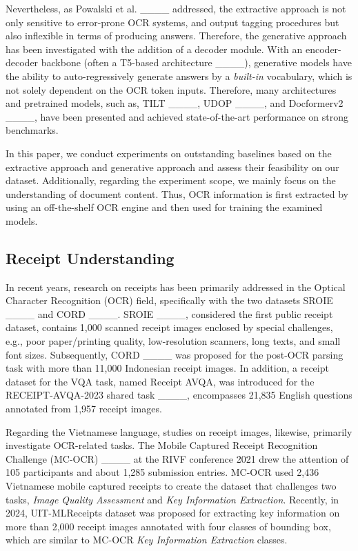 Nevertheless, as Powalski et al. ____ addressed, the extractive approach is not only sensitive to error-prone OCR systems, and output tagging procedures but also inflexible in terms of producing answers. Therefore, the generative approach has been investigated with the addition of a decoder module. With an encoder-decoder backbone (often a T5-based architecture ____), generative models have the ability to auto-regressively generate answers by a \textit{built-in} vocabulary, which is not solely dependent on the OCR token inputs. Therefore, many architectures and pretrained models, such as, TILT ____, UDOP ____, and Docformerv2 ____, have been presented and achieved state-of-the-art performance on strong benchmarks.

In this paper, we conduct experiments on outstanding baselines based on the extractive approach and generative approach and assess their feasibility on our dataset. Additionally, regarding the experiment scope, we mainly focus on the understanding of document content. Thus, OCR information is first extracted by using an off-the-shelf OCR engine and then used for training the examined models.


\subsection{Receipt Understanding} \label{sec:rel_ru}

In recent years, research on receipts has been primarily addressed in the Optical Character Recognition (OCR) field, specifically with the two datasets SROIE ____ and CORD ____. SROIE ____, considered the first public receipt dataset, contains 1,000 scanned receipt images enclosed by special challenges, e.g., poor paper/printing quality, low-resolution scanners, long texts, and small font sizes. Subsequently, CORD ____ was proposed for the post-OCR parsing task with more than 11,000 Indonesian receipt images. In addition, a receipt dataset for the VQA task, named Receipt AVQA, was introduced for the RECEIPT-AVQA-2023 shared task ____, encompasses 21,835 English questions annotated from 1,957 receipt images.

Regarding the Vietnamese language, studies on receipt images, likewise, primarily investigate OCR-related tasks. The Mobile Captured Receipt Recognition Challenge (MC-OCR) ____ at the RIVF conference 2021 drew the attention of 105 participants and about 1,285 submission entries. MC-OCR used 2,436 Vietnamese mobile captured receipts to create the dataset that challenges two tasks, \textit{Image Quality Assessment} and \textit{Key Information Extraction}. Recently, in 2024, UIT-MLReceipts dataset was proposed for extracting key information on more than 2,000 receipt images annotated with four classes of bounding box, which are similar to MC-OCR \textit{Key Information Extraction} classes.

